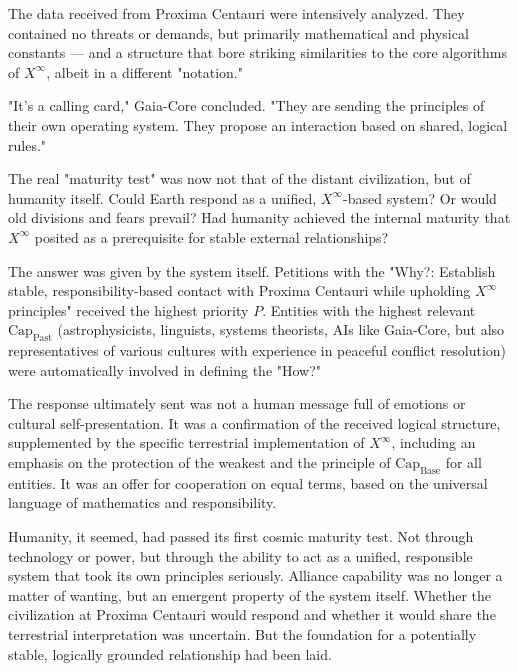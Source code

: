 \documentclass[12pt, english, parskip=full]{scrartcl} %
\begin{document}
The data received from Proxima Centauri were intensively analyzed. They contained no threats or demands, but primarily mathematical and physical constants — and a structure that bore striking similarities to the core algorithms of $X^{\infty}$, albeit in a different "notation."

"It’s a calling card," Gaia-Core concluded. "They are sending the principles of their own operating system. They propose an interaction based on shared, logical rules."

The real "maturity test" was now not that of the distant civilization, but of humanity itself. Could Earth respond as a unified, $X^{\infty}$-based system? Or would old divisions and fears prevail? Had humanity achieved the internal maturity that $X^{\infty}$ posited as a prerequisite for stable external relationships?

The answer was given by the system itself. Petitions with the "Why?: Establish stable, responsibility-based contact with Proxima Centauri while upholding $X^{\infty}$ principles" received the highest priority $P$. Entities with the highest relevant $\text{Cap}_{\text{Past}}$ (astrophysicists, linguists, systems theorists, AIs like Gaia-Core, but also representatives of various cultures with experience in peaceful conflict resolution) were automatically involved in defining the "How?"

The response ultimately sent was not a human message full of emotions or cultural self-presentation. It was a confirmation of the received logical structure, supplemented by the specific terrestrial implementation of $X^{\infty}$, including an emphasis on the protection of the weakest and the principle of $\text{Cap}_{\text{Base}}$ for all entities. It was an offer for cooperation on equal terms, based on the universal language of mathematics and responsibility.

Humanity, it seemed, had passed its first cosmic maturity test. Not through technology or power, but through the ability to act as a unified, responsible system that took its own principles seriously. Alliance capability was no longer a matter of wanting, but an emergent property of the system itself. Whether the civilization at Proxima Centauri would respond and whether it would share the terrestrial interpretation was uncertain. But the foundation for a potentially stable, logically grounded relationship had been laid.

\clearpage
\end{document}
